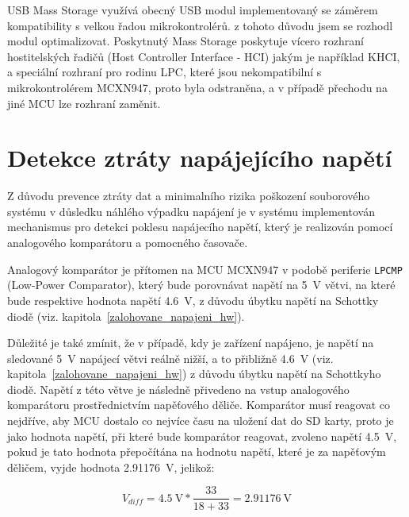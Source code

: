 USB Mass Storage využívá obecný USB modul implementovaný se záměrem kompatibility s velkou řadou mikrokontrolérů. z tohoto důvodu jsem se rozhodl modul optimalizovat. Poskytnutý Mass Storage poskytuje vícero rozhraní hostitelských řadičů (Host Controller Interface - HCI) jakým je například KHCI, a speciální rozhraní pro rodinu LPC, které jsou nekompatibilní s mikrokontrolérem MCXN947, proto byla odstraněna, a v případě přechodu na jiné MCU lze rozhraní zaměnit. 

\section{Detekce ztráty napájejícího napětí}
Z důvodu prevence ztráty dat a minimalního rizika poškození souborového systému v důsledku náhlého výpadku napájení je v systému implementován mechanismus pro detekci poklesu napájecího napětí, který je realizován pomocí analogového komparátoru a pomocného časovače.  

Analogový komparátor je přítomen na MCU MCXN947 v podobě periferie \texttt{LPCMP} (Low-Power Comparator), který bude porovnávat napětí na \SI{5}{\volt} větvi, na které bude respektive hodnota napětí \SI{4.6}{\volt}, z důvodu úbytku napětí na Schottky diodě (viz. kapitola~\ref{zalohovane_napajeni_hw}).

Důležité je také zmínit, že v případě, kdy je zařízení napájeno, je napětí na sledované \SI{5}{\volt} napájecí větvi reálně nižší, a to přibližně \SI{4.6}{\volt} (viz. kapitola~\ref{zalohovane_napajeni_hw}) z důvodu úbytku napětí na Schottkyho diodě. Napětí z této větve je následně přivedeno na vstup analogového komparátoru prostřednictvím napěťového děliče. Komparátor musí reagovat co nejdříve, aby MCU dostalo co nejvíce času na uložení dat do SD karty, proto je jako hodnota napětí, při které bude komparátor reagovat, zvoleno napětí \SI{4.5}{\volt}, pokud je tato hodnota přepočítána na hodnotu napětí, které je za napěťovým děličem, vyjde hodnota \SI{2.91176}{\volt}, jelikož:

\begin{equation}
    V_{diff} = \SI{4.5}{\volt} * \frac{33}{18 + 33} = \SI{2.91176}{\volt} 
    \label{eq:trigger-cmp-val}
\end{equation}


